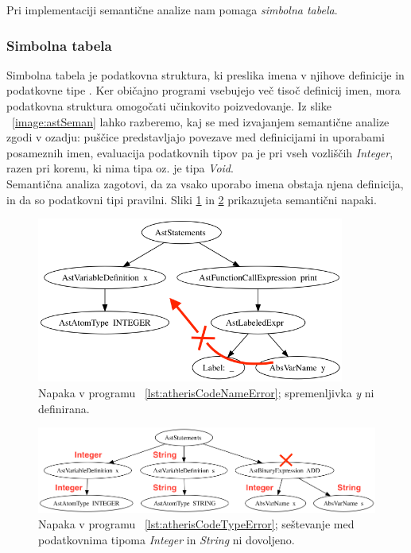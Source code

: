 \documentclass[a4paper, 12p]{book}
\begin{document}
Pri implementaciji semantične analize nam pomaga \textit{simbolna tabela}.

\subsubsection{Simbolna tabela}

Simbolna tabela je podatkovna struktura, ki preslika imena v njihove definicije in podatkovne tipe \cite{modernCompiler}.  Ker običajno programi vsebujejo več tisoč definicij imen, mora podatkovna struktura omogočati učinkovito poizvedovanje. Iz slike ~\ref{image:astSeman} lahko razberemo, kaj se med izvajanjem semantične analize zgodi v ozadju: puščice predstavljajo povezave med definicijami in uporabami posameznih imen, evaluacija podatkovnih tipov pa je pri vseh vozliščih \textit{Integer}, razen pri korenu, ki nima tipa oz. je tipa \textit{Void}.\\
\indent Semantična analiza zagotovi, da za vsako uporabo imena obstaja njena definicija, in da so podatkovni tipi pravilni. Sliki \ref{image:astSemanCodeNameError} in \ref{image:astSemanTypeError} prikazujeta semantični napaki.

\begin{figure}[h]
	\begin{center}
		\includegraphics[width=0.9\textwidth]{resources/astSemanNameError.png}
	\end{center}
	\caption{Napaka v programu ~\ref{lst:atherisCodeNameError}; spremenljivka \textit{y} ni definirana.}
	\label{image:astSemanCodeNameError}
\end{figure}

\begin{figure}[h]
	\begin{center}
		\includegraphics[width=1\textwidth]{resources/astSemanTypeError.png}
	\end{center}
	\caption{Napaka v programu ~\ref{lst:atherisCodeTypeError}; seštevanje med podatkovnima tipoma \textit{Integer} in \textit{String} ni dovoljeno.}
	\label{image:astSemanTypeError}
\end{figure}
\end{document}
